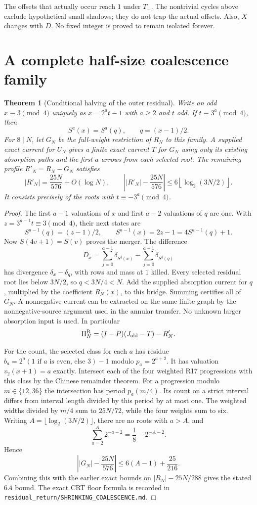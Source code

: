 \documentclass[11pt]{article}
\newtheorem{theorem}{Theorem}
\newcommand{\PiR}{\Pi^{\mathrm R}}
\begin{document}
The offsets that actually occur reach $1$ under $T_-$. The nontrivial
cycles above exclude hypothetical small shadows; they do not trap the
actual offsets. Also, $X$ changes with $D$. No fixed integer is proved
to remain isolated forever.

\section{A complete half-size coalescence family}
\begin{theorem}[Conditional halving of the outer residual]\label{thm:halving}
Write an odd $x\equiv3\pmod4$ uniquely as $x=2^at-1$ with
$a\ge2$ and $t$ odd. If $t\equiv3^a\pmod4$, then
\[
S^a(x)=S^a(q),\qquad q=(x-1)/2.
\]
For $8\mid N$, let $G_N$ be the full-weight restriction of $R_N$
to this family. A supplied exact current for $U_N$ gives a finite
exact current $T$ for $G_N$ using only its existing absorption paths
and the first $a$ arrows from each selected root. The remaining profile
$R'_N=R_N-G_N$ satisfies
\[
|R'_N|=\frac{25N}{576}+O(\log N),\qquad
\left||R'_N|-\frac{25N}{576}\right|
\le6\left\lfloor\log_2(3N/2)\right\rfloor.
\]
It consists precisely of the roots with $t\equiv-3^a\pmod4$.
\end{theorem}
\begin{proof}
The first $a-1$ valuations of $x$ and first $a-2$ valuations of $q$
are one. With $z=3^{a-1}t\equiv3\pmod4$, their next states are
\[
S^{a-1}(q)=(z-1)/2,\qquad
S^{a-1}(x)=2z-1=4S^{a-1}(q)+1.
\]
Now $S(4v+1)=S(v)$ proves the merger. The difference
\[
D_x=\sum_{j=0}^{a-1}\delta_{S^j(x)}
       -\sum_{j=0}^{a-1}\delta_{S^j(q)}
\]
has divergence $\delta_x-\delta_q$, with rows and mass at $1$ killed.
Every selected residual root lies below $3N/2$, so $q<3N/4<N$.
Add the supplied absorption current for $q$, multiplied by the
coefficient $R_N(x)$, to this bridge. Summing certifies all of $G_N$.
A nonnegative current can be extracted on the same finite graph by
the nonnegative-source argument used in the annular transfer.
No unknown larger absorption input is used. In particular
\[
\PiR_N=(I-P)(J_{\rm old}-T)-R'_N.
\]

For the count, the selected class for each $a$ has residue
$b_a=2^a(1\text{ if }a\text{ is even, else }3)-1$
modulo $p_a=2^{a+2}$. It has valuation $v_2(x+1)=a$ exactly.
Intersect each of the four weighted R17 progressions with this class
by the Chinese remainder theorem. For a progression modulo
$m\in\{12,36\}$ the intersection has period $p_a(m/4)$.
Its count on a strict interval differs from interval length divided
by this period by at most one. The weighted widths divided by $m/4$
sum to $25N/72$, while the four weights sum to six.
Writing $A=\lfloor\log_2(3N/2)\rfloor$, there are no roots with
$a>A$, and
\[
\sum_{a=2}^A2^{-a-2}=\frac18-2^{-A-2}.
\]
Hence
\[
\left||G_N|-\frac{25N}{576}\right|
\le6(A-1)+\frac{25}{216}.
\]
Combining this with the earlier exact bounds on
$|R_N|-25N/288$ gives the stated $6A$ bound.
The exact CRT floor formula is recorded in
\texttt{residual\_return/SHRINKING\_COALESCENCE.md}.
\end{proof}
\end{document}
